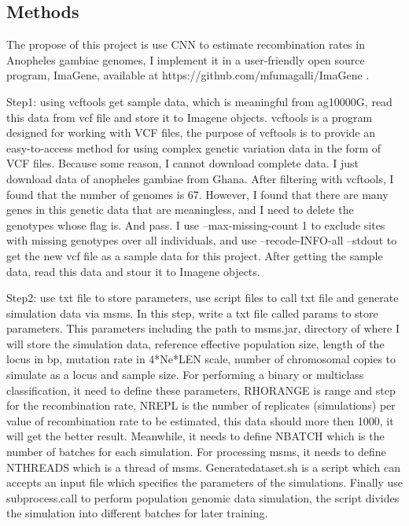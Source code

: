 \documentclass[11pt,a4 paper,title page]{article}
\begin{document}
    \subsection{Methods}
  The propose of this project is use CNN to estimate recombination rates in Anopheles gambiae genomes, I implement it in a user-friendly open source program, ImaGene, available at https://github.com/mfumagalli/ImaGene .
  \hfill\break
  
  Step1: using vcftools get sample data, which is meaningful from ag10000G, read this data from vcf file and store it to Imagene objects.
vcftools is a program designed for working with VCF files, the purpose of vcftools is to provide an easy-to-access method for using complex genetic variation data in the form of VCF files. Because some reason, I cannot download complete data. I just download data of anopheles gambiae from Ghana. After filtering with vcftools, I found that the number of genomes is 67. However, I found that there are many genes in this genetic data that are meaningless, and I need to delete the genotypes whose flag is. And pass. I use --max-missing-count 1 to exclude sites with missing genotypes over all individuals, and use –recode-INFO-all –stdout to get the new vcf file as a sample data for this project. After getting the sample data, read this data and stour it to Imagene objects.
  \hfill\break
  
  Step2: use txt file to store parameters, use script files to call txt file and generate simulation data via msms.
In this step, write a txt file called params to store parameters. This parameters including the path to msms.jar, directory of where I will store the simulation data, reference effective population size, length of the locus in bp, mutation rate in 4*Ne*LEN scale, number of chromosomal copies to simulate as a locus and sample size. For performing a binary or multiclass classification, it need to define these parameters, RHORANGE is range and step for the recombination rate, NREPL is the number of replicates (simulations) per value of recombination rate to be estimated, this data should more then 1000, it will get the better result. Meanwhile, it needs to define NBATCH which is the number of batches for each simulation. For processing msms, it needs to define NTHREADS which is a thread of msms. Generatedataset.sh is a script which can accepts an input file which specifies the parameters of the simulations. Finally use subprocess.call to perform population genomic data simulation, the script divides the simulation into different batches for later training.
  \hfill\break
  
\end{document}
